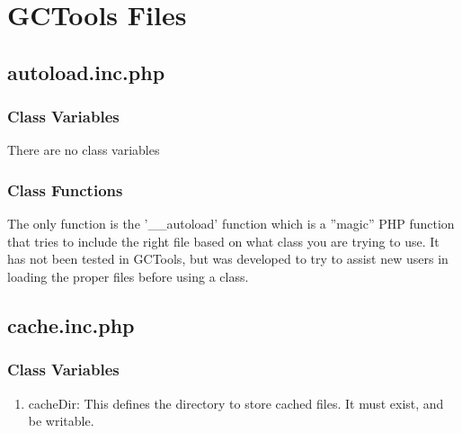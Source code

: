 \documentclass{article}
\begin{document}
\newpage

\section{GCTools Files}
\subsection{autoload.inc.php}
\subsubsection{Class Variables}
There are no class variables

\subsubsection{Class Functions}
The only function is the '\_\_autoload' function which is a ''magic'' PHP function that tries to include the right file based on what class you are trying to use. It has not been tested in GCTools, but was developed to try to assist new users in loading the proper files before using a class.

\newpage

\subsection{cache.inc.php}
\subsubsection{Class Variables}
\begin{enumerate}
\item cacheDir: This defines the directory to store cached files. It must exist, and be writable.
\end{enumerate}
\end{document}
